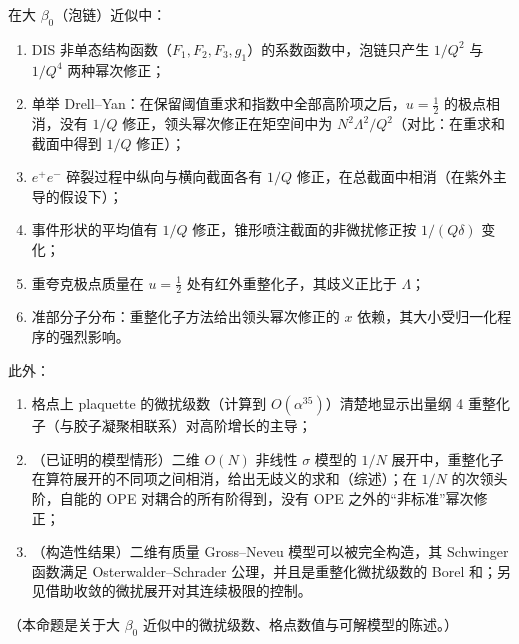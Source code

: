 \begin{proposition}\label{prop:power-renormalon-examples}
在大 $\beta_0$（泡链）近似中：
\begin{enumerate}[label=(\alph*),leftmargin=2em,itemsep=1pt,topsep=2pt]
\item DIS 非单态结构函数（$F_1,F_2,F_3,g_1$）的系数函数中，泡链只产生 $1/Q^2$ 与 $1/Q^4$ 两种幂次修正\cite{DasguptaWebber1996}；
\item 单举 Drell--Yan：在保留阈值重求和指数中全部高阶项之后，$u=\frac12$ 的极点相消，没有 $1/Q$ 修正，领头幂次修正在矩空间中为 $N^2\Lambda^2/Q^2$\cite{BenekeBraun1995b}（对比：\cite{Korchemsky:1994is}在重求和截面中得到 $1/Q$ 修正）；
\item $e^+e^-$ 碎裂过程中纵向与横向截面各有 $1/Q$ 修正，在总截面中相消（在紫外主导的假设下）\cite{BenekeBraunMagnea1997}；
\item 事件形状的平均值有 $1/Q$ 修正\cite{DokshitzerWebber1995}，锥形喷注截面的非微扰修正按 $1/(Q\delta)$ 变化\cite{Korchemsky:1994is}；
\item 重夸克极点质量在 $u=\frac12$ 处有红外重整化子，其歧义正比于 $\Lambda$\cite{Bigi:1994em,Beneke:1994sw}；
\item 准部分子分布：重整化子方法给出领头幂次修正的 $x$ 依赖，其大小受归一化程序的强烈影响\cite{Braun:2018brg}。
\end{enumerate}
此外：
\begin{enumerate}[label=(\alph*),leftmargin=2em,itemsep=1pt,topsep=2pt,start=7]
\item 格点上 plaquette 的微扰级数（计算到 $O(\alpha^{35})$）清楚地显示出量纲 4 重整化子（与胶子凝聚相联系）对高阶增长的主导\cite{Bali:2014fea}；
\item（已证明的模型情形）二维 $O(N)$ 非线性 $\sigma$ 模型的 $1/N$ 展开中，重整化子在算符展开的不同项之间相消，给出无歧义的求和\cite{David:1982qv}（综述\cite{Novikov:1984ac}）；在 $1/N$ 的次领头阶，自能的 OPE 对耦合的所有阶得到，没有 OPE 之外的“非标准”幂次修正\cite{Beneke:1998eq}；
\item（构造性结果）二维有质量 Gross--Neveu 模型可以被完全构造，其 Schwinger 函数满足 Osterwalder--Schrader 公理，并且是重整化微扰级数的 Borel 和\cite{Feldman:1986ax}；另见借助收敛的微扰展开对其连续极限的控制\cite{Gawedzki:1985ez}。
\end{enumerate}
（本命题是关于大 $\beta_0$ 近似中的微扰级数、格点数值与可解模型的陈述。）
\end{proposition}

